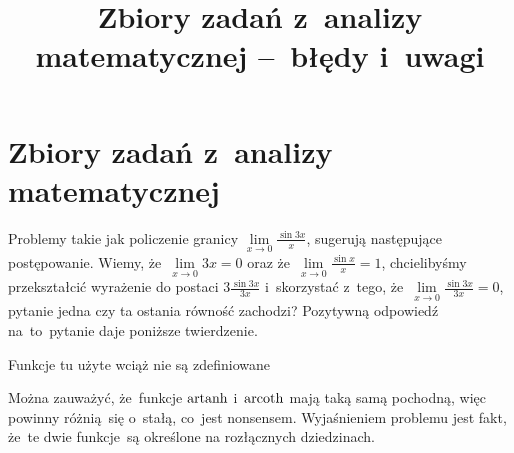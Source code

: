 \documentclass[a4paper,11pt]{article}
\title{Zbiory zadań z~analizy matematycznej --~błędy i~uwagi}
\begin{document}





\maketitle  %





\newpage
\section{Zbiory zadań z~analizy matematycznej}

\vspace{\spaceTwo}







\start {} Problemy takie jak policzenie granicy
$\lim\limits_{ x \to 0 } \frac{ \sin 3 x }{ x }$, sugerują następujące
postępowanie. Wiemy, że~$\lim\limits_{ x \to 0 } 3x = 0$ oraz
że~$\lim\limits_{ x \to 0 } \frac{ \sin x }{ x } = 1$, chcielibyśmy
przekształcić wyrażenie do postaci $3 \frac{ \sin 3x }{ 3x }$
i~skorzystać z~tego, że~$\lim\limits_{ x \to 0 } \frac{ \sin 3x }{ 3x } = 0$,
pytanie jedna czy ta ostania równość zachodzi? Pozytywną odpowiedź
na~to~pytanie daje poniższe twierdzenie.

Funkcje tu użyte wciąż nie są zdefiniowane

\vspace{\spaceFour}



\start {} Można
zauważyć, że~funkcje $\operatorname{artanh}$ i~$\operatorname{arcoth}$ mają taką samą pochodną,
więc powinny różnią~się o~stałą, co~jest nonsensem. Wyjaśnieniem
problemu jest fakt, że~te dwie funkcje~są określone na rozłącznych
dziedzinach.

\vspace{\spaceFour}
\end{document}
